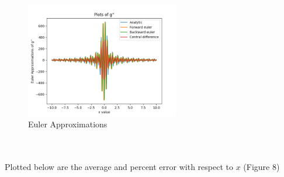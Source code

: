 \documentclass[12pt]{article}
\begin{document}
\begin{figure}[h]
	\centering
	\includegraphics[width=0.60\textwidth]{gdprimeeulerplot.png}
	\caption{Euler Approximations}
\end{figure}\\\\
Plotted below are the average and percent error with respect to $x$ (Figure 8)
\end{document}
